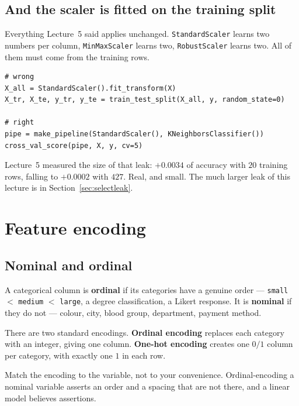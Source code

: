 \documentclass[11pt]{article}
\begin{document}
\subsection{And the scaler is fitted on the training split}

Everything Lecture~5 said applies unchanged. \texttt{StandardScaler} learns two
numbers per column, \texttt{MinMaxScaler} learns two, \texttt{RobustScaler}
learns two. All of them must come from the training rows.

\begin{lstlisting}
# wrong
X_all = StandardScaler().fit_transform(X)
X_tr, X_te, y_tr, y_te = train_test_split(X_all, y, random_state=0)

# right
pipe = make_pipeline(StandardScaler(), KNeighborsClassifier())
cross_val_score(pipe, X, y, cv=5)
\end{lstlisting}

Lecture~5 measured the size of that leak: $+0.0034$ of accuracy with $20$
training rows, falling to $+0.0002$ with $427$. Real, and small. The much
larger leak of this lecture is in Section~\ref{sec:selectleak}.

\notesources{\AMLUnitIVSources}

\section{Feature encoding}
\label{sec:encode}

\subsection{Nominal and ordinal}

A categorical column is \textbf{ordinal} if its categories have a genuine
order --- \texttt{small} $<$ \texttt{medium} $<$ \texttt{large}, a degree
classification, a Likert response. It is \textbf{nominal} if they do not ---
colour, city, blood group, department, payment method.

There are two standard encodings. \textbf{Ordinal encoding} replaces each
category with an integer, giving one column. \textbf{One-hot encoding} creates
one $0/1$ column per category, with exactly one $1$ in each row.

\begin{keyidea}
Match the encoding to the variable, not to your convenience. Ordinal-encoding
a nominal variable asserts an order and a spacing that are not there, and a
linear model believes assertions.
\end{keyidea}
\end{document}
